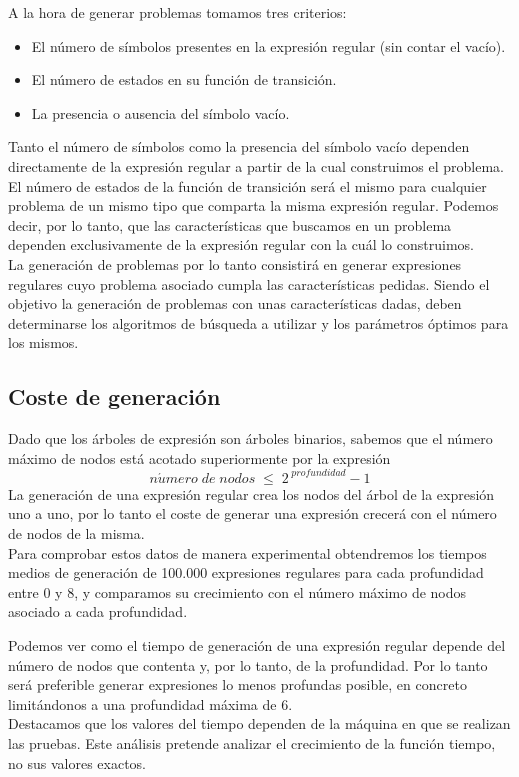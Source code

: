 A la hora de generar problemas tomamos tres criterios:
\begin{itemize}
	\item El número de símbolos presentes en la expresión regular (sin contar el vacío).
	\item El número de estados en su función de transición.
	\item La presencia o ausencia del símbolo vacío.
\end{itemize}
Tanto el número de símbolos como la presencia del símbolo vacío dependen directamente de la expresión regular a partir de la cual construimos el problema.
El número de estados de la función de transición será el mismo para cualquier problema de un mismo tipo que comparta la misma expresión regular.
Podemos decir, por lo tanto, que las características que buscamos en un problema dependen exclusivamente de la expresión regular con la cuál lo construimos.
\\
La generación de problemas por lo tanto consistirá en generar expresiones regulares cuyo problema asociado cumpla las características pedidas.
Siendo el objetivo la generación de problemas con unas características dadas, deben determinarse los algoritmos de búsqueda a utilizar y los parámetros óptimos para los mismos.

\subsection{Coste de generación}

Dado que los árboles de expresión son árboles binarios, sabemos que el número máximo de nodos está acotado superiormente por la expresión
\[
n\acute{u}mero \; de \; nodos \; \leq \; 2^{\;profundidad} - 1
\]
La generación de una expresión regular crea los nodos del árbol de la expresión uno a uno, por lo tanto el coste de generar una expresión crecerá con el número de nodos de la misma.
\\
Para comprobar estos datos de manera experimental obtendremos los tiempos medios de generación de 100.000 expresiones regulares para cada profundidad entre 0 y 8, y comparamos su crecimiento con el número máximo de nodos asociado a cada profundidad.


Podemos ver como el tiempo de generación de una expresión regular depende del número de nodos que contenta y, por lo tanto, de la profundidad.
Por lo tanto será preferible generar expresiones lo menos profundas posible, en concreto limitándonos a una profundidad máxima de 6.
\\
Destacamos que los valores del tiempo dependen de la máquina en que se realizan las pruebas.
Este análisis pretende analizar el crecimiento de la función tiempo, no sus valores exactos.

